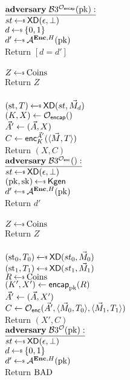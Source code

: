 \begin{figure}[tbhp]
\begin{center}
{
 {$\adversaryv{\;\advB3^{\mathcal{O}_\encap}(\pk)}$}\\
$st \getsr \mdalg(\epsilon,\bot)$\\
$d \getsr \bits$\\
$d' \getsr \advA^{\encOracle,H}(\pk)$\\
Return $[d=d']$\\ 

\\
  $Z \getsr \mathrm{Coins}$\\
  Return $Z$\\

\\
$(\st, \umd) \getsr \mdalg(st,\vmsg_d)$\\
$(K,X) \gets \mathcal{O}_\encap()$\\
$\vec{A}' \gets (\vec{A}, X)$\\
$C \gets {\mathsf{enc}}_{K}^{\vec{A}'}(\langle \vec{M}, T\rangle)$\\
Return $(X,C)$\\
}
{
{$\adversaryv{\;\advB3^{\mathcal{O}_\enc}()}$}\\
$st \getsr \mdalg(\epsilon,\bot)$\\
$(\pk,\sk)\getsr\Kgen$\\
$d' \getsr \advA^{\encOracle,H}(\pk)$\\
Return $d'$\\ 

\\
  $Z \getsr \mathrm{Coins}$\\
  Return $Z$\\

\\
$(\st_0, \umd_0) \getsr \mdalg(st_0,\vmsg_0)$\\
$(\st_1, \umd_1) \getsr \mdalg(st_1,\vmsg_1)$\\
$R \getsr \mathrm{Coins}$\\
$(K',X') \gets \mathsf{encap}_{\mathrm{pk}}^{}(R)$\\
$\vec{A}' \gets (\vec{A}, X')$\\
$C \gets \mathcal{O}_{\mathsf{enc}}(\vec{A}',\langle \vec{M}_0,T_0\rangle, \langle \vec{M}_1,T_1\rangle)$\\
Return $(X',C)$\\
}
{
{$\adversaryv{\;\advB3^{\mathcal{O}}(\pk)}$}\\
$st \getsr \mdalg(\epsilon,\bot)$\\
$d \getsr \bits$\\ 
$d' \getsr \advA^{\encOracle,H}(\pk)$\\
Return $\mathrm{BAD}$\\ 

}
\end{center}
\end{figure}
